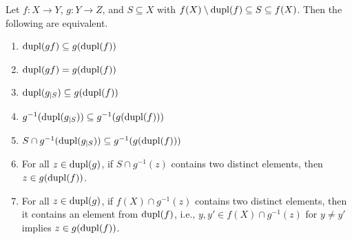 \begin{corollary} \label{prelim:func:duplconcat:cor:gS}
	Let $f \colon X \to Y$, $g \colon Y \to Z$,
	and $S \subseteq X$ with $f(X) \setminus \dupl{f} \subseteq S \subseteq f(X)$.
	Then the following are equivalent.	
	\begin{enumerate}
		\item \label{prelim:func:duplconcat:cor:gS:2} $\dupl{\concat{f}{g}} \subseteq g(\dupl{f})$	
		
		\item \label{prelim:func:duplconcat:cor:gS:3} $\dupl{\concat{f}{g}} = g(\dupl{f})$	
						
		\item \label{prelim:func:duplconcat:cor:gS:1} $\dupl{g_{|S}} \subseteq g(\dupl{f})$
			
		\item \label{prelim:func:duplconcat:cor:gS:4} 
		$g^{-1}(\dupl{g_{|S}}) \subseteq g^{-1}(g(\dupl{f}))$	
			
		\item \label{prelim:func:duplconcat:cor:gS:4x} $S \cap g^{-1}(\dupl{g_{|S}}) \subseteq g^{-1}(g(\dupl{f}))$		
				
		\item \label{prelim:func:duplconcat:cor:gS:4xx} For all $z \in \dupl{g}$,
		if $S \cap g^{-1}(z)$
		contains two distinct elements, then $z \in g(\dupl{f})$.
		
		\item \label{prelim:func:duplconcat:cor:gS:4xxx} For all $z \in \dupl{g}$,
		if $f(X) \cap g^{-1}(z)$ contains two distinct elements, then
		it contains an element from $\dupl{f}$, i.e., $y,y' \in f(X) \cap g^{-1}(z)$
		for $y \ne y'$ implies $z \in g(\dupl{f})$.
	\end{enumerate}	
\end{corollary}
